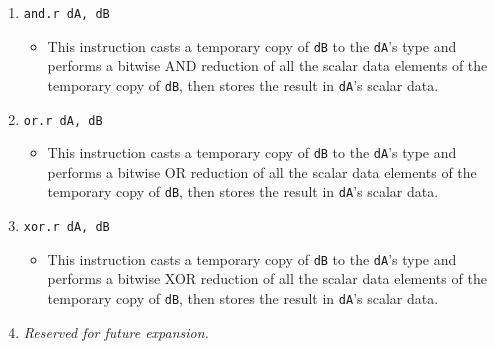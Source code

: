\documentclass{article}
\begin{document}
\begin{itemize}
\begin{enumerate}
			\item \texttt{and.r dA, dB}
				\begin{itemize}
				\item This instruction casts a temporary copy of
					\texttt{dB} to the \texttt{dA}'s type and performs a
					bitwise AND reduction of all the scalar data elements
					of the temporary copy of \texttt{dB}, then stores the
					result in \texttt{dA}'s scalar data.
				\end{itemize}
			\item \texttt{or.r dA, dB}
				\begin{itemize}
				\item This instruction casts a temporary copy of
					\texttt{dB} to the \texttt{dA}'s type and performs a
					bitwise OR reduction of all the scalar data elements of
					the temporary copy of \texttt{dB}, then stores the
					result in \texttt{dA}'s scalar data.
				\end{itemize}
			\item \texttt{xor.r dA, dB}
				\begin{itemize}
				\item This instruction casts a temporary copy of
					\texttt{dB} to the \texttt{dA}'s type and performs a
					bitwise XOR reduction of all the scalar data elements
					of the temporary copy of \texttt{dB}, then stores the
					result in \texttt{dA}'s scalar data.
				\end{itemize}
			\item \textit{Reserved for future expansion.}



\end{enumerate}
\end{itemize}
\end{document}
